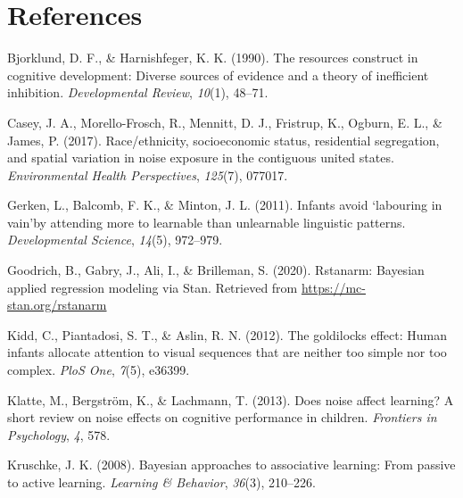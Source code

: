 \documentclass[10pt, letterpaper]{article}
\newenvironment{CSLReferences}%
  {}%
  {\par}
\begin{document}
\hypertarget{references}{%
\section{References}\label{references}}

\setlength{\parindent}{-0.1in} 
\setlength{\leftskip}{0.125in}

\noindent

\hypertarget{refs}{}
\begin{CSLReferences}{1}{0}
\leavevmode{}%
Bjorklund, D. F., \& Harnishfeger, K. K. (1990). The resources construct
in cognitive development: Diverse sources of evidence and a theory of
inefficient inhibition. \emph{Developmental Review}, \emph{10}(1),
48--71.

\leavevmode{}%
Casey, J. A., Morello-Frosch, R., Mennitt, D. J., Fristrup, K., Ogburn,
E. L., \& James, P. (2017). Race/ethnicity, socioeconomic status,
residential segregation, and spatial variation in noise exposure in the
contiguous united states. \emph{Environmental Health Perspectives},
\emph{125}(7), 077017.

\leavevmode{}%
Gerken, L., Balcomb, F. K., \& Minton, J. L. (2011). Infants avoid
`labouring in vain'by attending more to learnable than unlearnable
linguistic patterns. \emph{Developmental Science}, \emph{14}(5),
972--979.

\leavevmode{}%
Goodrich, B., Gabry, J., Ali, I., \& Brilleman, S. (2020). Rstanarm:
{Bayesian} applied regression modeling via {Stan}. Retrieved from
\url{https://mc-stan.org/rstanarm}

\leavevmode{}%
Kidd, C., Piantadosi, S. T., \& Aslin, R. N. (2012). The goldilocks
effect: Human infants allocate attention to visual sequences that are
neither too simple nor too complex. \emph{PloS One}, \emph{7}(5),
e36399.

\leavevmode{}%
Klatte, M., Bergström, K., \& Lachmann, T. (2013). Does noise affect
learning? A short review on noise effects on cognitive performance in
children. \emph{Frontiers in Psychology}, \emph{4}, 578.

\leavevmode{}%
Kruschke, J. K. (2008). Bayesian approaches to associative learning:
From passive to active learning. \emph{Learning \& Behavior},
\emph{36}(3), 210--226.


\end{CSLReferences}
\end{document}
